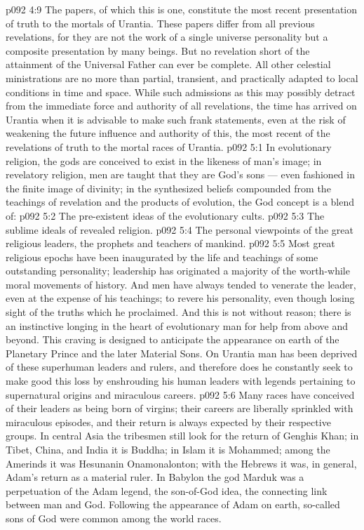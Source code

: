 \vs p092 4:9 \bibnobreakspace {} The papers, of which this is one, constitute the most recent presentation of truth to the mortals of Urantia. These papers differ from all previous revelations, for they are not the work of a single universe personality but a composite presentation by many beings. But no revelation short of the attainment of the Universal Father can ever be complete. All other celestial ministrations are no more than partial, transient, and practically adapted to local conditions in time and space. While such admissions as this may possibly detract from the immediate force and authority of all revelations, the time has arrived on Urantia when it is advisable to make such frank statements, even at the risk of weakening the future influence and authority of this, the most recent of the revelations of truth to the mortal races of Urantia.
\vs p092 5:1 In evolutionary religion, the gods are conceived to exist in the likeness of man’s image; in revelatory religion, men are taught that they are God’s sons --- even fashioned in the finite image of divinity; in the synthesized beliefs compounded from the teachings of revelation and the products of evolution, the God concept is a blend of:
\vs p092 5:2 \bibnobreakspace The pre\hyp{}existent ideas of the evolutionary cults.
\vs p092 5:3 \bibnobreakspace The sublime ideals of revealed religion.
\vs p092 5:4 \bibnobreakspace The personal viewpoints of the great religious leaders, the prophets and teachers of mankind.
\vs p092 5:5 \pc Most great religious epochs have been inaugurated by the life and teachings of some outstanding personality; leadership has originated a majority of the worth\hyp{}while moral movements of history. And men have always tended to venerate the leader, even at the expense of his teachings; to revere his personality, even though losing sight of the truths which he proclaimed. And this is not without reason; there is an instinctive longing in the heart of evolutionary man for help from above and beyond. This craving is designed to anticipate the appearance on earth of the Planetary Prince and the later Material Sons. On Urantia man has been deprived of these superhuman leaders and rulers, and therefore does he constantly seek to make good this loss by enshrouding his human leaders with legends pertaining to supernatural origins and miraculous careers.
\vs p092 5:6 Many races have conceived of their leaders as being born of virgins; their careers are liberally sprinkled with miraculous episodes, and their return is always expected by their respective groups. In central Asia the tribesmen still look for the return of Genghis Khan; in Tibet, China, and India it is Buddha; in Islam it is Mohammed; among the Amerinds it was Hesunanin Onamonalonton; with the Hebrews it was, in general, Adam’s return as a material ruler. In Babylon the god Marduk was a perpetuation of the Adam legend, the son\hyp{}of\hyp{}God idea, the connecting link between man and God. Following the appearance of Adam on earth, so\hyp{}called sons of God were common among the world races.
